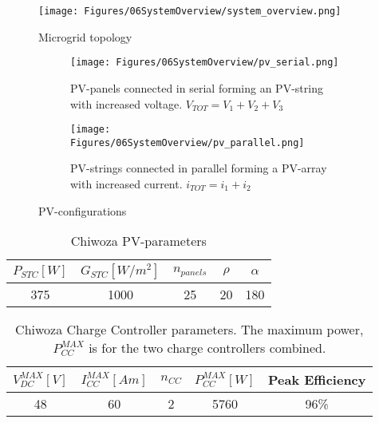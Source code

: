 \begin{figure}
    \centering
    \texttt{[image: Figures/06SystemOverview/system\_overview.png]}
    \caption[Microgrid Topology]{Microgrid topology}
    \label{fig:system_topology}
\end{figure}

\begin{figure}
    \begin{subfigure}{\textwidth}
    \centering
    \texttt{[image: Figures/06SystemOverview/pv\_serial.png]}
    \caption[PV-serial]{PV-panels connected in serial forming an PV-string with increased voltage. $V_{TOT} = V_1 + V_2 + V_3$}
    \label{fig:pv_serial}
  \end{subfigure}

  \vspace{0.5cm}

  \begin{subfigure}{\textwidth}
    \centering
    \texttt{[image: Figures/06SystemOverview/pv\_parallel.png]}
    \caption[PV-parallel]{PV-strings connected in parallel forming a PV-array with increased current. $i_{TOT} = i_1 + i_2$}
    \label{fig:pv_parallel}
  \end{subfigure}

  \caption[PV-configuration]{PV-configurations}
  \label{fig:pv_configuration}
\end{figure}

\begin{table}[]
    \centering
    \begin{tabular}{c|c|c|c|c|}
         $P_{STC}[W]$& $G_{STC}[W/m^2]$ & $n_{panels}$& $\rho$ & $\alpha$  \\
         \hline
         375 & 1000 & 25 & 20 & 180  \\
    \end{tabular}
    \caption[Chiwoza PV-parameters]{Chiwoza PV-parameters}
    \label{tab:chiwoza_pv_param}
\end{table}

\begin{table}[]
    \centering
    \begin{tabular}{c|c|c|c|c}
         $V^{MAX}_{DC}[V]$& $I^{MAX}_{CC}[Am]$ & $n_{CC}$ & $P^{MAX}_{CC}[W]$ & Peak Efficiency \\
         \hline
         48 & 60 & 2 & 5760 & 96\%\\
    \end{tabular}
    \caption[Chiwoza Charge Controller parameters]{Chiwoza Charge Controller parameters. The maximum power, $P^{MAX}_{CC}$ is for the two charge controllers combined.}
    \label{tab:chiwoza_cc_param}
\end{table}

